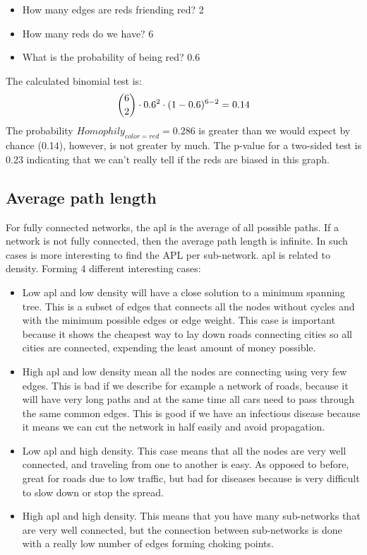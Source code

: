     \begin{itemize}
        \item How many edges are reds friending red? 2
        \item How many reds do we have? 6
        \item What is the probability of being red? 0.6 
    \end{itemize}

The calculated binomial test is:
    \begin{equation*}
         \dbinom{6}{2} \cdot 0.6^2 \cdot (1-0.6)^{6-2} = 0.14
    \end{equation*}
The probability $Homophily_{color = red} = 0.286$ is greater than we would expect by chance (0.14), however, is not greater by much. The p-value for a two-sided test is 0.23 indicating that we can't really tell if the reds are biased in this graph.

\subsection{Average path length}

For fully connected networks, the \gls{apl} is the average of all possible paths. If a network is not fully connected, then the average path length is infinite. In such cases is more interesting to find the APL per sub-network. \gls{apl} is related to density. Forming 4 different interesting cases:

\begin{itemize}
    \item  Low \gls{apl} and low density will have a close solution to a minimum spanning tree. This is a subset of edges that connects all the nodes without cycles and with the minimum possible edges or edge weight. This case is important because it shows the cheapest way to lay down roads connecting cities so all cities are connected, expending the least amount of money possible.
    \item  High \gls{apl} and low density mean all the nodes are connecting using very few edges. This is bad if we describe for example a network of roads, because it will have very long paths and at the same time all cars need to pass through the same common edges. This is good if we have an infectious disease because it means we can cut the network in half easily and avoid propagation.
    \item  Low \gls{apl} and high density. This case means that all the nodes are very well connected, and traveling from one to another is easy. As opposed to before, great for roads due to low traffic, but bad for diseases because is very difficult to slow down or stop the spread.
    \item  High \gls{apl} and high density. This means that you have many sub-networks that are very well connected, but the connection between sub-networks is done with a really low number of edges forming choking points.
\end{itemize}

